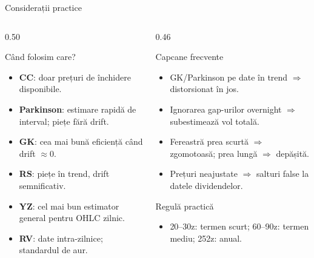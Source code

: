 \documentclass[9pt, aspectratio=169, t]{beamer}
\theoremstyle{definition}
\begin{document}
\begin{frame}{Considerații practice}
\begin{columns}[T]
\begin{column}{0.50\textwidth}
\begin{block}{Când folosim care?}
\begin{itemize}\setlength{\itemsep}{0pt}
    \item \textbf{CC}: doar prețuri de închidere disponibile.
    \item \textbf{Parkinson}: estimare rapidă de interval; piețe fără drift.
    \item \textbf{GK}: cea mai bună eficiență când drift $\approx 0$.
    \item \textbf{RS}: piețe în trend, drift semnificativ.
    \item \textbf{YZ}: cel mai bun estimator general pentru OHLC zilnic.
    \item \textbf{RV}: date intra-zilnice; standardul de aur.
\end{itemize}
\end{block}
\end{column}
\begin{column}{0.46\textwidth}
\begin{block}{Capcane frecvente}
\begin{itemize}\setlength{\itemsep}{0pt}
    \item GK/Parkinson pe date în trend $\Rightarrow$ distorsionat în jos.
    \item Ignorarea gap-urilor overnight $\Rightarrow$ subestimează vol totală.
    \item Fereastră prea scurtă $\Rightarrow$ zgomotoasă; prea lungă $\Rightarrow$ depășită.
    \item Prețuri neajustate $\Rightarrow$ salturi false la datele dividendelor.
\end{itemize}
\end{block}
\begin{alertblock}{Regulă practică}
\begin{itemize}\setlength{\itemsep}{0pt}
    \item 20--30z: termen scurt; 60--90z: termen mediu; 252z: anual.
\end{itemize}
\end{alertblock}
\end{column}
\end{columns}
\end{frame}
\end{document}
